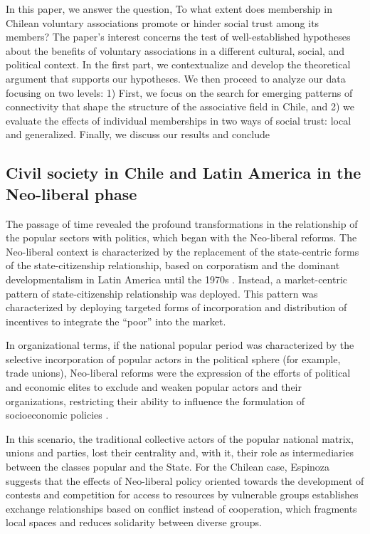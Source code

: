 In this paper, we answer the question, To what extent does membership in Chilean voluntary associations promote or hinder social trust among its members? The paper's interest concerns the test of well-established hypotheses about the benefits of voluntary associations in a different cultural, social, and political context. In the first part, we contextualize and develop the theoretical argument that supports our hypotheses. We then proceed to analyze our data focusing on two levels: 1) First, we focus on the search for emerging patterns of connectivity that shape the structure of the associative field in Chile, and 2) we evaluate the effects of individual memberships in two ways of social trust: local and generalized. Finally, we discuss our results and conclude

\subsection{Civil society in Chile and Latin America in the Neo-liberal phase}

The passage of time revealed the profound transformations in the relationship of the popular sectors with politics, which began with the Neo-liberal reforms. The Neo-liberal context is characterized by the replacement of the state-centric forms of the state-citizenship relationship, based on corporatism and the dominant developmentalism in Latin America until the 1970s \parencite{oxhorn_neopluralism_2004, garreton_cambios_2001}. Instead, a market-centric pattern of state-citizenship relationship was deployed. This pattern was characterized by deploying targeted forms of incorporation and distribution of incentives to integrate the “poor” into the market.
\bigskip

In organizational terms, if the national popular period was characterized by the selective incorporation of popular actors in the political sphere (for example, trade unions), Neo-liberal reforms were the expression of the efforts of political and economic elites to exclude and weaken popular actors and their organizations, restricting their ability to influence the formulation of socioeconomic policies \parencite{collier_shaping_1991, cook_politics_2009, espinoza_local_2013, rossi_second_2015, silva_reshaping_2018}.
\bigskip

In this scenario, the traditional collective actors of the popular national matrix, unions and parties, lost their centrality \parencite{barozet_entre_2016,espinoza_local_2013,garreton_cambios_2001} and, with it, their role as intermediaries between the classes popular and the State. For the Chilean case, Espinoza \parencite*{espinoza_local_2013} suggests that the effects of Neo-liberal policy oriented towards the development of contests and competition for access to resources by vulnerable groups establishes exchange relationships based on conflict instead of cooperation, which fragments local spaces and reduces solidarity between diverse groups.
\bigskip

